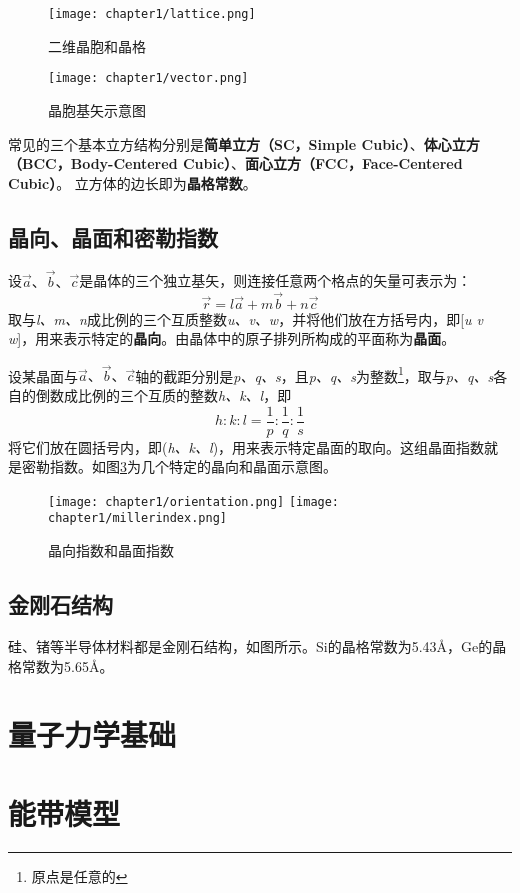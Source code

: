 \begin{figure}[hbt]
  \centering
  \texttt{[image: chapter1/lattice.png]}
  \caption{二维晶胞和晶格}
  \label{fig-lattice}
\end{figure}
\begin{figure}[hbt]
  \centering
  \texttt{[image: chapter1/vector.png]}
  \caption{晶胞基矢示意图}
  \label{fig-vector}
\end{figure}

常见的三个基本立方结构分别是\textbf{简单立方（SC，Simple Cubic）}、\textbf{体心立方（BCC，Body-Centered Cubic）}、\textbf{面心立方（FCC，Face-Centered Cubic）}。
立方体的边长即为\textbf{晶格常数}。

\subsection{晶向、晶面和密勒指数}
设$\vec{a}、\vec{b}、\vec{c}$是晶体的三个独立基矢，则连接任意两个格点的矢量可表示为：
\[ \vec{r} = l\vec{a} + m\vec{b} + n\vec{c}\]
取与\textit{l、m、n}成比例的三个互质整数\textit{u、v、w}，并将他们放在方括号内，即[\textit{u v w}]，用来表示特定的\textbf{晶向}。由晶体中的原子排列所构成的平面称为\textbf{晶面}。

设某晶面与$\vec{a}、\vec{b}、\vec{c}$轴的截距分别是\textit{p、q、s}，且\textit{p、q、s}为整数\footnote{原点是任意的}，取与\textit{p、q、s}各自的倒数成比例的三个互质的整数\textit{h、k、l}，即
\[h: k: l=\frac{1}{p}: \frac{1}{q}: \frac{1}{s}\]
将它们放在圆括号内，即(\textit{h、k、l})，用来表示特定晶面的取向。这组晶面指数就是密勒指数。如图\ref{fig-index}为几个特定的晶向和晶面示意图。
\begin{figure}[hbt]
  \centering
  \texttt{[image: chapter1/orientation.png]}
  \texttt{[image: chapter1/millerindex.png]}
  \caption{晶向指数和晶面指数}
  \label{fig-index}
\end{figure}

\subsection{金刚石结构}
硅、锗等半导体材料都是金刚石结构，如图所示。Si的晶格常数为5.43\AA，Ge的晶格常数为5.65\AA。

\section{量子力学基础}

\section{能带模型}